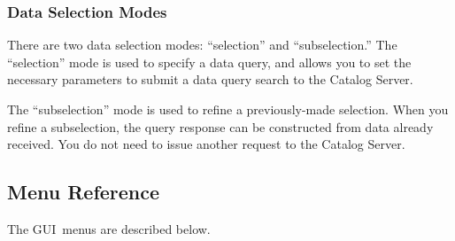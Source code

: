 \documentclass[10pt]{report}
\newcommand{\cs}{Catalog Server}
\newcommand{\gui}{GUI}
\begin{document}
\subsubsection{Data Selection Modes}

There are two data selection modes: ``selection'' and
``subselection.''  The ``selection'' mode is used to specify a data
query, and allows you to set the necessary parameters to submit a data
query search to the \cs .

The ``subselection'' mode is used to refine a previously-made
selection.  When you refine a subselection, the query response can be
constructed from data already received.  You do not need to issue
another request to the \cs .

\subsection{Menu Reference}
\label{sec:menu}

The \gui\ menus are described below.
\end{document}
